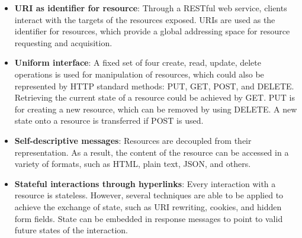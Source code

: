 \begin{itemize}
  \item \textbf{URI as identifier for resource}:  Through a RESTful web service, clients interact with the targets of the resources exposed. URIs are used as the identifier for resources, which provide a global addressing space for resource requesting and acquisition. 

  \item \textbf{Uniform interface}:  A fixed set of four create, read, update, delete operations is used for manipulation of resources, which could also be represented by HTTP standard methods: PUT, GET, POST, and DELETE.  Retrieving the current state of a resource could be achieved by GET. PUT is for creating a new resource, which can be removed by using DELETE. A new state onto a resource is transferred if POST is used.

  \item \textbf{Self-descriptive messages}:  Resources are decoupled from their representation. As a result, the content of the resource can be accessed in a variety of formats, such as HTML, plain text, JSON, and others.

  \item \textbf{Stateful interactions through hyperlinks}:  Every interaction with a resource is stateless. However, several techniques are able to be applied to achieve the exchange of state, such as URI rewriting, cookies, and hidden form fields. State can be embedded in response messages to point to valid future states of the interaction\cite{richardson2008restful}. 


\end{itemize}






